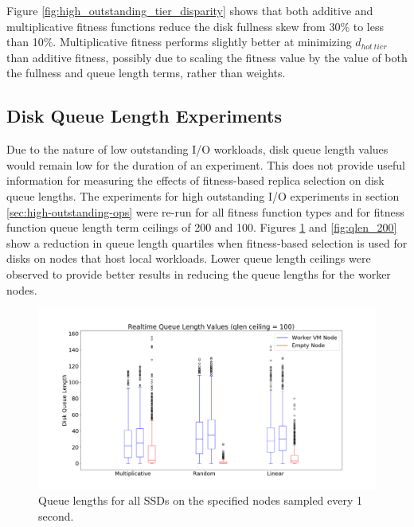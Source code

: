 \documentclass[12pt]{article}
\begin{document}
    Figure \ref{fig:high_outstanding_tier_disparity} shows that both additive
    and multiplicative fitness functions reduce the disk fullness skew from
    30\% to less than 10\%. Multiplicative fitness performs slightly better at
    minimizing $d_{hot\ tier}$ than additive fitness, possibly due to scaling
    the fitness value by the value of both the fullness and queue length terms,
    rather than weights.
  
  \subsection{Disk Queue Length Experiments} \label{experiments-qlen}

  Due to the nature of low outstanding I/O workloads, disk queue length values
  would remain low for the duration of an experiment. This does not provide
  useful information for measuring the effects of fitness-based replica
  selection on disk queue lengths. The experiments for high outstanding I/O
  experiments in section \ref{sec:high-outstanding-ops} were re-run for all
  fitness function types and for fitness function queue length term ceilings of
  200 and 100. Figures \ref{fig:qlen_100} and \ref{fig:qlen_200} show a
  reduction in queue length quartiles when fitness-based selection is used for
  disks on nodes that host local workloads. Lower queue length ceilings were
  observed to provide better results in reducing the queue lengths for the
  worker nodes.

  \begin{figure}[!htb]
    \centering
    \includegraphics[scale=0.32]{images/qlen_100_box.png} 
    \caption{Queue lengths for all SSDs on the specified nodes sampled every 1
             second.}
    \label{fig:qlen_100}
  \end{figure}
\end{document}
